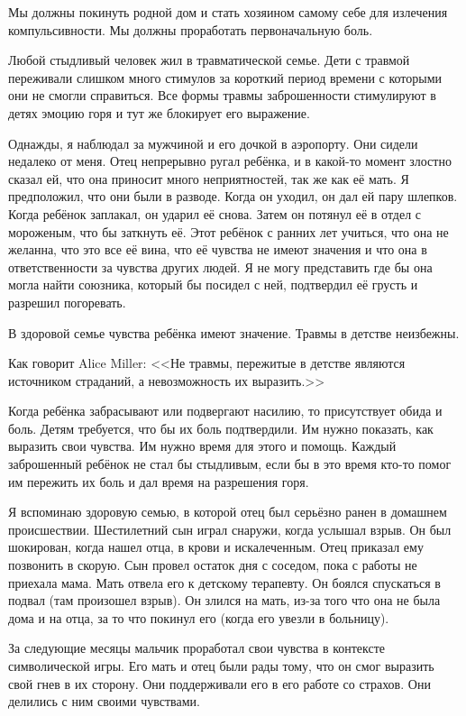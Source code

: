 \documentclass[10pt, fleqn]{article}
\begin{document}
Мы должны покинуть родной дом и стать хозяином самому себе для излечения компульсивности. Мы должны проработать первоначальную боль.


Любой стыдливый человек жил в травматической семье. Дети с травмой переживали слишком много стимулов за короткий период времени с которыми они не смогли справиться. Все формы травмы заброшенности стимулируют в детях эмоцию горя и тут же блокирует его выражение.

Однажды, я наблюдал за мужчиной и его дочкой в аэропорту. Они сидели недалеко от меня. Отец непрерывно ругал ребёнка, и в какой-то момент злостно сказал ей, что она приносит много неприятностей, так же как её мать. Я предположил, что они были в разводе. Когда он уходил, он дал ей пару шлепков. Когда ребёнок заплакал, он ударил её снова. Затем он потянул её в отдел с мороженым, что бы заткнуть её. Этот ребёнок с ранних лет учиться, что она не желанна, что это все её вина, что её чувства не имеют значения и что она в ответственности за чувства других людей. Я не могу представить где бы она могла найти союзника, который бы посидел с ней, подтвердил её грусть и разрешил погоревать.

В здоровой семье чувства ребёнка имеют значение. Травмы в детстве неизбежны.

Как говорит Alice Miller: <<Не травмы, пережитые в детстве являются источником страданий, а невозможность их выразить.>>

Когда ребёнка забрасывают или подвергают насилию, то присутствует обида и боль. Детям требуется, что бы их боль подтвердили. Им нужно показать, как выразить свои чувства. Им нужно время для этого и помощь. Каждый заброшенный ребёнок не стал бы стыдливым, если бы в это время кто-то помог им пережить их боль и дал время на разрешения горя.

Я вспоминаю здоровую семью, в которой отец был серьёзно ранен в домашнем происшествии. Шестилетний сын играл снаружи, когда услышал взрыв. Он был шокирован, когда нашел отца, в крови и искалеченным. Отец приказал ему позвонить в скорую. Сын провел остаток дня с соседом, пока с работы не приехала мама. Мать отвела его к детскому терапевту. Он боялся спускаться в подвал (там произошел взрыв). Он злился на мать, из-за того что она не была дома и на отца, за то что покинул его (когда его увезли в больницу).

За следующие месяцы мальчик проработал свои чувства в контексте символической игры. Его мать и отец были рады тому, что он смог выразить свой гнев в их сторону. Они поддерживали его в его работе со страхов. Они делились с ним своими чувствами.
\end{document}
